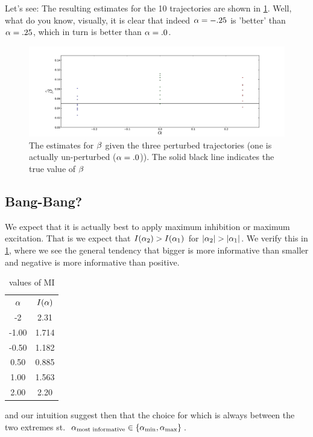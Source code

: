 \documentclass{article}
\begin{document}
Let's see: The resulting estimates for the 10 trajectories are shown in
\cref{fig:perturbed_estimates}. Well, what do you know, visually, it is clear
that indeed ${\alpha}=-.25$ is  'better' than ${\alpha}=.25$, which in turn is better than ${\alpha}=.0$.
\begin{figure}
\begin{center}
\includegraphics[width=1\textwidth]{Figs/MIML/perturbed_estimates.pdf}
\caption[]{The estimates for ${\beta}$ given the three perturbed
trajectories (one is actually un-perturbed (${\alpha}=.0$)). The solid black line
indicates the true value of ${\beta}$}
\label{fig:perturbed_estimates}
\end{center}
\end{figure}

\subsection{Bang-Bang?}
We expect that it is actually best to apply maximum inhibition or maximum
excitation. That is we expect that $I({\alpha}_2) > I({\alpha}_1)$ for $|{\alpha}_2| > |{\alpha}_1|$. We
verify this in \cref{tab:MI_bang_bang_alphas}, where we see the general tendency
that bigger is more informative than smaller and negative is more informative
than positive.
\begin{table}
\begin{centering}
\begin{tabular}{cc}
${\alpha}$& $I({\alpha})$ \\
-2&  2.31 \\
-1.00 & 1.714 \\
-0.50 & 1.182 \\
0.50 & 0.885 \\
1.00 & 1.563 \\
2.00 &  2.20 \\
\end{tabular}
\caption{values of MI}
\label{tab:MI_bang_bang_alphas}
\end{centering}
\end{table}
 and our intuition suggest then that the choice
for which is always between the two extremes st.\ ${\alpha}_{\textrm{most
informative}} \in \{{ {\alpha}_{\textrm{min}} }, { {\alpha}_{\textrm{max}} }\}$.
\end{document}
